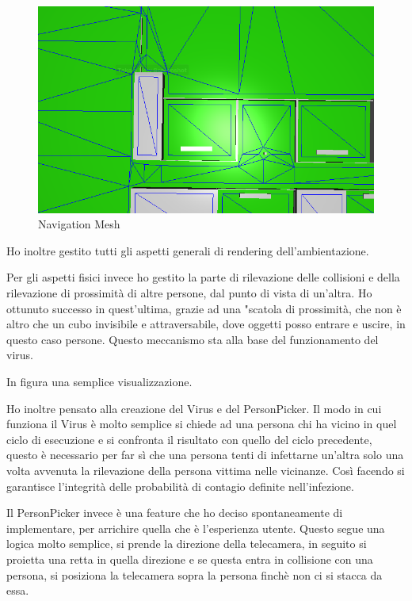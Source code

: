 \documentclass[a4paper,12pt]{report}
\begin{document}
\begin{figure}[h]
\centering{}
\includegraphics{./navmesh_obstacle.png}
\caption{Navigation Mesh}
\label{img:Navigation Mesh}
\end{figure}

Ho inoltre gestito tutti gli aspetti generali di rendering dell'ambientazione.

Per gli aspetti fisici invece ho gestito la parte di rilevazione delle collisioni e della rilevazione di prossimità di altre persone, dal punto di vista di un'altra.
Ho ottunuto successo in quest'ultima, grazie ad una "scatola di prossimità, che non è altro che un cubo invisibile e attraversabile, dove oggetti posso entrare e uscire, in questo caso persone.
Questo meccanismo sta alla base del funzionamento del virus.

In figura una semplice visualizzazione.

Ho inoltre pensato alla creazione del Virus e del PersonPicker.
Il modo in cui funziona il Virus è molto semplice si chiede ad una persona chi ha vicino in quel ciclo di esecuzione e si confronta il risultato con quello del ciclo precedente, questo è necessario per far sì che una persona tenti di infettarne un'altra solo una volta avvenuta la rilevazione della persona vittima nelle vicinanze.
Così facendo si garantisce l'integrità delle probabilità di contagio definite nell'infezione.

Il PersonPicker invece è una feature che ho deciso spontaneamente di implementare, per arrichire quella che è l'esperienza utente.
Questo segue una logica molto semplice, si prende la direzione della telecamera, in seguito si proietta una retta in quella direzione e se questa entra in collisione con una persona, si posiziona la telecamera sopra la persona finchè non ci si stacca da essa.
\end{document}
